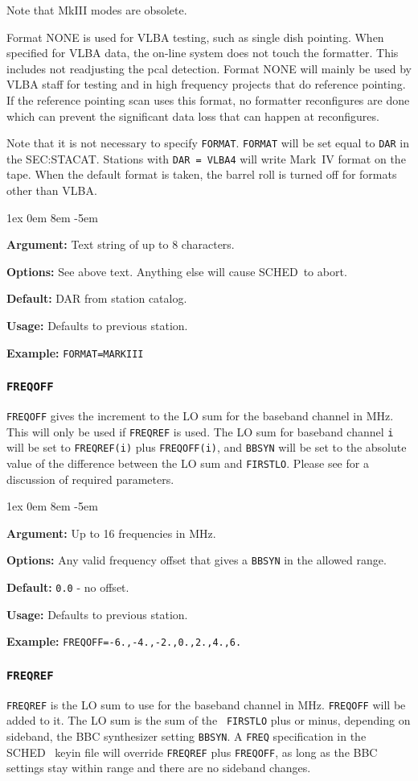 \documentclass{report}
\newcommand{\schedb}{{\sc SCHED~}}
\newcommand{\rcwbox}[5]{
  \begin{list}{}{\parsep 1ex  \itemsep 0em
                 \leftmargin 8em  \itemindent -5em }
    \item {\bf Argument:} #1
    \item {\bf Options:}  #2
    \item {\bf Default:}  #3
    \item {\bf Usage:}    #4
    \item {\bf Example:}  #5
  \end{list}
}
\begin{document}
Note that MkIII modes are obsolete.

Format NONE is used for VLBA testing, such as single dish pointing.
When specified for VLBA data, the on-line system does not touch the
formatter.  This includes not readjusting the pcal detection.
Format NONE will mainly be used by VLBA staff for testing and in
high frequency projects that do reference pointing.  If the reference
pointing scan uses this format, no formatter reconfigures are done
which can prevent the significant data loss that can happen at
reconfigures.

Note that it is not necessary to specify {\tt FORMAT}.  {\tt FORMAT}
will be set equal to {\tt DAR} in the 
{SEC:STACAT}.  Stations with {\tt DAR = VLBA4} will write Mark~IV
format on the tape.  When the default format is taken, the barrel roll
is turned off for formats other than VLBA.

\rcwbox
{Text string of up to 8 characters.}
{See above text. Anything else will cause \schedb to abort.}
{DAR from station catalog.}
{Defaults to previous station.}
{{\tt FORMAT=MARKIII}}


\subsubsection{\label{SP:FREQOFF}{\tt FREQOFF}}

{\tt FREQOFF} gives the increment to the LO sum for the baseband
channel in MHz. This will only be used if {\tt FREQREF} is used. The
LO sum for baseband channel {\tt i} will be set to {\tt FREQREF(i)}
plus {\tt FREQOFF(i)}, and {\tt BBSYN} will be set to the absolute
value of the difference between the LO sum and {\tt FIRSTLO}. Please
see  for a discussion of required
parameters.

\rcwbox
{Up to 16 frequencies in MHz.}
{Any valid frequency offset that gives a {\tt BBSYN} in the allowed
range.}
{{\tt 0.0} - no offset.}
{Defaults to previous station.}
{{\tt FREQOFF=-6.,-4.,-2.,0.,2.,4.,6.}}


\subsubsection{\label{SP:FREQREF}{\tt FREQREF}}

{\tt FREQREF} is the LO sum to use for the baseband channel in MHz.
{\tt FREQOFF} will be added to it. The LO sum is the sum of the {\tt
FIRSTLO} plus or minus, depending on sideband, the BBC synthesizer
setting {\tt BBSYN}. A {\tt FREQ} specification in the \schedb
keyin file will override {\tt FREQREF} plus {\tt FREQOFF}, as long as
the BBC settings stay within range and there are no sideband changes.
\end{document}
